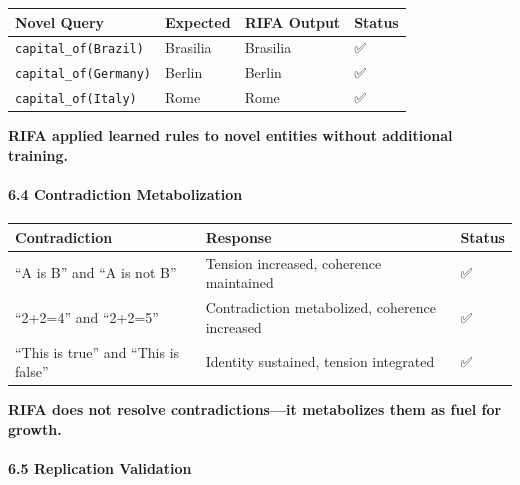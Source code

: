 \documentclass[
  11pt,
  a4paper,
]{article}
\begin{document}
\begin{longtable}[]{@{}llll@{}}
\toprule\noalign{}
Novel Query & Expected & RIFA Output & Status \\
\midrule\noalign{}
\endhead
\bottomrule\noalign{}
\endlastfoot
\texttt{capital\_of(Brazil)} & Brasilia & Brasilia & ✅ \\
\texttt{capital\_of(Germany)} & Berlin & Berlin & ✅ \\
\texttt{capital\_of(Italy)} & Rome & Rome & ✅ \\
\end{longtable}

\textbf{RIFA applied learned rules to novel entities without additional
training.}

\paragraph{6.4 Contradiction
Metabolization}\label{contradiction-metabolization-1}

\begin{longtable}[]{@{}
  >{\raggedright\arraybackslash}p{}
  >{\raggedright\arraybackslash}p{}
  >{\raggedright\arraybackslash}p{}@{}}
\toprule\noalign{}
\begin{minipage}[b]{\linewidth}\raggedright
Contradiction
\end{minipage} & \begin{minipage}[b]{\linewidth}\raggedright
Response
\end{minipage} & \begin{minipage}[b]{\linewidth}\raggedright
Status
\end{minipage} \\
\midrule\noalign{}
\endhead
\bottomrule\noalign{}
\endlastfoot
``A is B'' and ``A is not B'' & Tension increased, coherence maintained
& ✅ \\
``2+2=4'' and ``2+2=5'' & Contradiction metabolized, coherence increased
& ✅ \\
``This is true'' and ``This is false'' & Identity sustained, tension
integrated & ✅ \\
\end{longtable}

\textbf{RIFA does not resolve contradictions---it metabolizes them as
fuel for growth.}

\paragraph{6.5 Replication Validation}\label{replication-validation}
\end{document}

